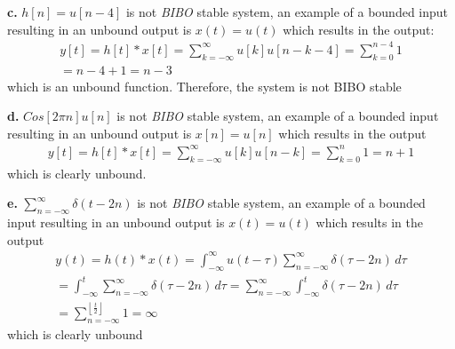 \documentclass[10pt, letterpaper]{article}
\begin{document}
\textbf{c.} $h[n] = u[n - 4]$ is not \emph{BIBO} stable system, an example of a bounded input 
resulting in an unbound output is $x(t) = u(t)$ which results in the output:
\begin{align*}
y[t] = h[t] * x[t] = 
\sum_{k = -\infty}^{\infty} u[k] u[n - k - 4] = \sum_{k = 0}^{n - 4} 1 \\
= n - 4 + 1 = \boxed{n - 3}
\end{align*}
which is an unbound function. Therefore, the system is not BIBO stable

\textbf{d.} $Cos[2\pi n] u[n]$ is not \emph{BIBO} stable system, an example of a bounded input 
resulting in an unbound output is $x[n]= u[n]$ which results in the output
\begin{align*}
y[t] = h[t] * x[t] = 
\sum_{k = -\infty}^{\infty} u[k] u[n - k] 
= \sum_{k = 0}^{n} 1 
= \boxed{n +1 }
\end{align*}
which is clearly unbound.

\textbf{e.} $\sum_{n = -\infty}^{\infty}\delta(t - 2n)$ is not \emph{BIBO} stable system, an example of a bounded input 
resulting in an unbound output is $x(t)= u(t)$ which results in the output
\begin{align*}
	y(t) = h(t) * x(t) = 
	\int_{-\infty}^{\infty} u(t - \tau)\sum_{n = -\infty}^{\infty} \delta(\tau - 2n) \, d\tau \\
	= \int_{-\infty}^{t} \sum_{n = -\infty}^{\infty} \delta(\tau - 2n) \, d\tau = 
	\sum_{n = -\infty}^{\infty}  \int_{-\infty}^{t} \delta(\tau - 2n) \, d\tau \\
	= \sum_{n = -\infty}^{\left \lfloor{\frac{t}{2}}\right \rfloor } 1 
	= \boxed{\infty}
\end{align*}
which is clearly unbound
\end{document}
